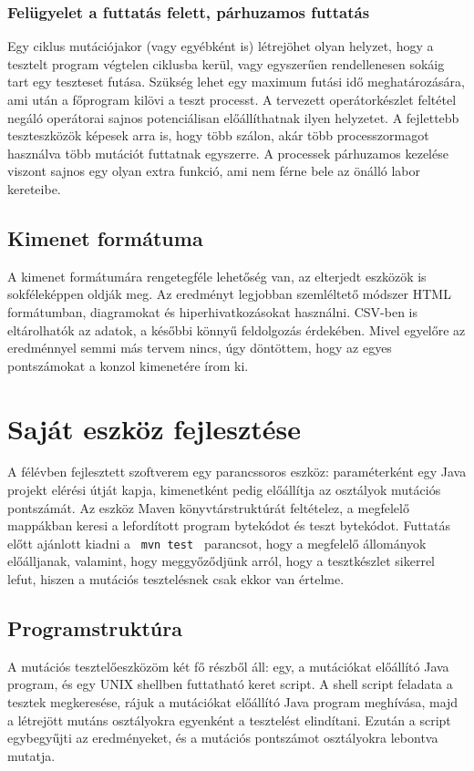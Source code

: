 \subsubsection{Felügyelet a futtatás felett, párhuzamos futtatás}
Egy ciklus mutációjakor (vagy egyébként is) létrejöhet olyan helyzet, hogy a tesztelt program végtelen ciklusba kerül, vagy egyszerűen rendellenesen sokáig tart egy teszteset futása. Szükség lehet egy maximum futási idő meghatározására, ami után a főprogram kilövi a teszt processt. A tervezett operátorkészlet feltétel negáló operátorai sajnos potenciálisan előállíthatnak ilyen helyzetet. A fejlettebb teszteszközök képesek arra is, hogy több szálon, akár több processzormagot használva több mutációt futtatnak egyszerre. A processek párhuzamos kezelése viszont sajnos egy olyan extra funkció, ami nem férne bele az önálló labor kereteibe.
\subsection{Kimenet formátuma}
A kimenet formátumára rengetegféle lehetőség van, az elterjedt eszközök is sokféleképpen oldják meg. Az eredményt legjobban szemléltető módszer HTML formátumban, diagramokat és hiperhivatkozásokat használni. CSV-ben is eltárolhatók az adatok, a későbbi könnyű feldolgozás érdekében. Mivel egyelőre az eredménnyel semmi más tervem nincs, úgy döntöttem, hogy az egyes pontszámokat a konzol kimenetére írom ki.
\section{Saját eszköz fejlesztése}
A félévben fejlesztett szoftverem egy parancssoros eszköz: paraméterként egy Java projekt elérési útját kapja, kimenetként pedig előállítja az osztályok mutációs pontszámát. Az eszköz Maven könyvtárstruktúrát feltételez, a megfelelő mappákban keresi a lefordított program bytekódot és teszt bytekódot. Futtatás előtt ajánlott kiadni a \lstinline{ mvn test } parancsot, hogy a megfelelő állományok előálljanak, valamint, hogy meggyőződjünk arról, hogy a tesztkészlet sikerrel lefut, hiszen a mutációs tesztelésnek csak ekkor van értelme.
\subsection{Programstruktúra}
A mutációs tesztelőeszközöm két fő részből áll: egy, a mutációkat előállító Java program, és egy UNIX shellben futtatható keret script. A shell script feladata a tesztek megkeresése, rájuk a mutációkat előállító Java program meghívása, majd a létrejött mutáns osztályokra egyenként a tesztelést elindítani. Ezután a script egybegyűjti az eredményeket, és a mutációs pontszámot osztályokra lebontva mutatja.
